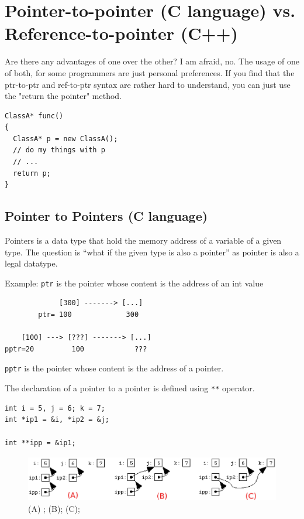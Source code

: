 \section{Pointer-to-pointer (C language) vs. Reference-to-pointer (C++)}

Are there any advantages of one over the other? I am afraid, no. The usage of
one of both, for some programmers are just personal preferences.
If you find that the ptr-to-ptr and ref-to-ptr syntax are rather hard to
understand, you can just use the "return the pointer" method.
\begin{verbatim}
ClassA* func()
{
  ClassA* p = new ClassA();
  // do my things with p
  // ...
  return p;
}
\end{verbatim}



\subsection{Pointer to Pointers (C language)}
\label{sec:pointer-pointers}


Pointers is a data type that hold the memory address of a variable of
a given type. The question is ``what if the given type is also a
pointer'' as pointer is also a legal datatype. 

Example: \verb!ptr! is the pointer whose content is the address of an int value
\begin{verbatim}
             [300] -------> [...]
        ptr= 100             300

    [100] ---> [???] -------> [...]
pptr=20         100            ??? 
\end{verbatim}
\verb!pptr! is the pointer whose content is the address of a pointer.


The declaration of a pointer to a pointer is defined using \verb!**!
operator.
\begin{lstlisting}
int i = 5, j = 6; k = 7;
int *ip1 = &i, *ip2 = &j;

int **ipp = &ip1;
\end{lstlisting}

% 
 
\begin{figure}[hbt]
  \centerline{\includegraphics[height=2cm,
    angle=0]{./images/c_pointer.eps}}
\caption{(A) ; (B); (C); }
\label{fig:c-pointer}
\end{figure}

